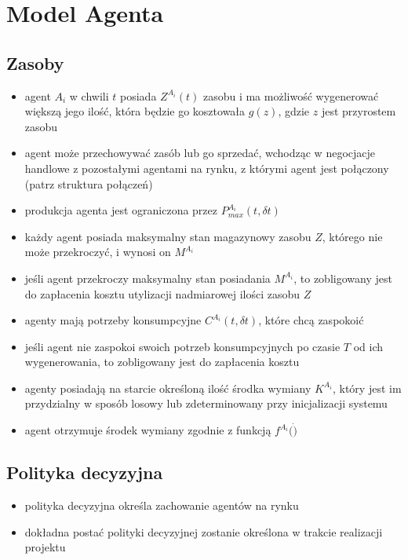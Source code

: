\documentclass[]{article}
\providecommand{\tightlist}{%
  \setlength{\itemsep}{0pt}\setlength{\parskip}{0pt}}
\begin{document}
\hypertarget{model-agenta}{%
\section{Model Agenta}\label{model-agenta}}

\hypertarget{zasoby}{%
\subsection{Zasoby}\label{zasoby}}

\begin{itemize}
\tightlist
\item
  agent \(A_i\) w chwili \(t\) posiada \(Z^{A_i}(t)\) zasobu i ma
  możliwość wygenerować większą jego ilość, która będzie go kosztowała
  \(g(z)\), gdzie \(z\) jest przyrostem zasobu
\item
  agent może przechowywać zasób lub go sprzedać, wchodząc w negocjacje
  handlowe z pozostałymi agentami na rynku, z którymi agent jest
  połączony (patrz struktura połączeń)
\item
  produkcja agenta jest ograniczona przez \(P^{A_i}_{max}(t, \delta t)\)
\item
  każdy agent posiada maksymalny stan magazynowy zasobu \(Z\), którego
  nie może przekroczyć, i wynosi on \(M^{A_i}\)
\item
  jeśli agent przekroczy maksymalny stan posiadania \(M^{A_i}\), to
  zobligowany jest do zapłacenia kosztu utylizacji nadmiarowej ilości
  zasobu \(Z\)
\item
  agenty mają potrzeby konsumpcyjne \(C^{A_i}(t, \delta t)\), które chcą
  zaspokoić
\item
  jeśli agent nie zaspokoi swoich potrzeb konsumpcyjnych po czasie \(T\)
  od ich wygenerowania, to zobligowany jest do zapłacenia kosztu
\item
  agenty posiadają na starcie określoną ilość środka wymiany
  \(K^{A_i}\), który jest im przydzialny w sposób losowy lub
  zdeterminowany przy inicjalizacji systemu
\item
  agent otrzymuje środek wymiany zgodnie z funkcją \(f^{A_i}(\dot)\)
\end{itemize}

\hypertarget{polityka-decyzyjna}{%
\subsection{Polityka decyzyjna}\label{polityka-decyzyjna}}

\begin{itemize}
\tightlist
\item
  polityka decyzyjna określa zachowanie agentów na rynku
\item
  dokładna postać polityki decyzyjnej zostanie określona w trakcie
  realizacji projektu
\end{itemize}
\end{document}
